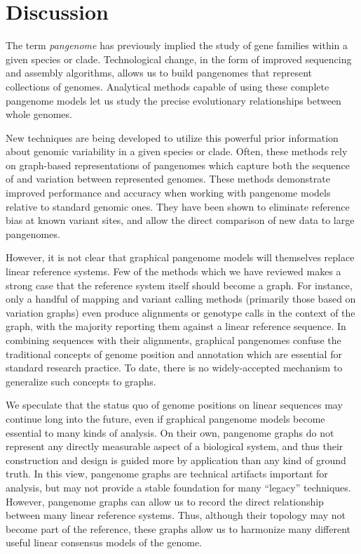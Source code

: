 \section{Discussion}
\label{sec:discussion}

The term \emph{pangenome} has previously implied the study of gene families within a given species or clade.
Technological change, in the form of improved sequencing and assembly algorithms, allows us to build pangenomes that represent collections of genomes.
Analytical methods capable of using these complete pangenome models let us study the precise evolutionary relationships between whole genomes.

New techniques are being developed to utilize this powerful prior information about genomic variability in a given species or clade.
Often, these methods rely on graph-based representations of pangenomes which capture both the sequence of and variation between represented genomes.
These methods demonstrate improved performance and accuracy when working with pangenome models relative to standard genomic ones.
They have been shown to eliminate reference bias at known variant sites, and allow the direct comparison of new data to large pangenomes.

However, it is not clear that graphical pangenome models will themselves replace linear reference systems.
Few of the methods which we have reviewed makes a strong case that the reference system itself should become a graph.
For instance, only a handful of mapping and variant calling methods (primarily those based on variation graphs) even produce alignments or genotype calls in the context of the graph, with the majority reporting them against a linear reference sequence.
In combining sequences with their alignments, graphical pangenomes confuse the traditional concepts of genome position and annotation which are essential for standard research practice.
To date, there is no widely-accepted mechanism to generalize such concepts to graphs.

We speculate that the status quo of genome positions on linear sequences may continue long into the future, even if graphical pangenome models become essential to many kinds of analysis.
On their own, pangenome graphs do not represent any directly measurable aspect of a biological system, and thus their construction and design is guided more by application than any kind of ground truth.
In this view, pangenome graphs are technical artifacts important for analysis, but may not provide a stable foundation for many ``legacy'' techniques.
However, pangenome graphs can allow us to record the direct relationship between many linear reference systems.
Thus, although their topology may not become part of the reference, these graphs allow us to harmonize many different useful linear consensus models of the genome.

